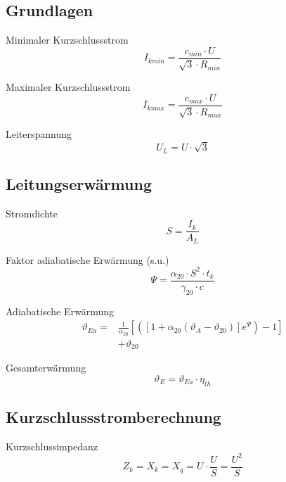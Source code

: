 \documentclass[11pt, a4paper, draft, fleqn, twocolumn]{article}
\numberwithin{equation}{subsection}
\begin{document}
\subsection{Grundlagen}

Minimaler Kurzschlussstrom
\begin{equation}
    I_{kmin} = \frac{c_{min} \cdot U}{\sqrt{3} \cdot R_{min}}
\end{equation}

\noindent Maximaler Kurzschlussstrom
\begin{equation}
    I_{kmax} = \frac{c_{max} \cdot U}{\sqrt{3} \cdot R_{max}}
\end{equation}

\noindent Leiterspannung
\begin{equation}
    U_L = U \cdot \sqrt{3}
\end{equation}


\subsection{Leitungserwärmung}

Stromdichte
\begin{equation}
    S = \frac{I_k}{A_L}
\end{equation}

\noindent Faktor adiabatische Erwärmung (s.u.)
\begin{equation}
    \Psi = \frac{\alpha_{20} \cdot S^2 \cdot t_k}{\gamma_{20} \cdot c}
\end{equation}

\noindent Adiabatische Erwärmung
\begin{equation}
\begin{split}
\vartheta_{Ea} = & \frac{1}{\alpha_{20}} \left[ \left( \left[ 1 + \alpha_{20}(\vartheta_{A} - \vartheta_{20}) \right] e^{\Psi} \right) -1 \right] \\
& + \vartheta_{20}
\end{split}
\end{equation}

\noindent Gesamterwärmung
\begin{equation}
    \vartheta_{E} = \vartheta_{Ea} \cdot \eta_{th}
\end{equation}


\subsection{Kurzschlussstromberechnung}

Kurzschlussimpedanz
\begin{equation}
    Z_k = X_k = X_q = U \cdot \frac{U}{S} = \frac{U^2 }{S}
\end{equation}
\end{document}
